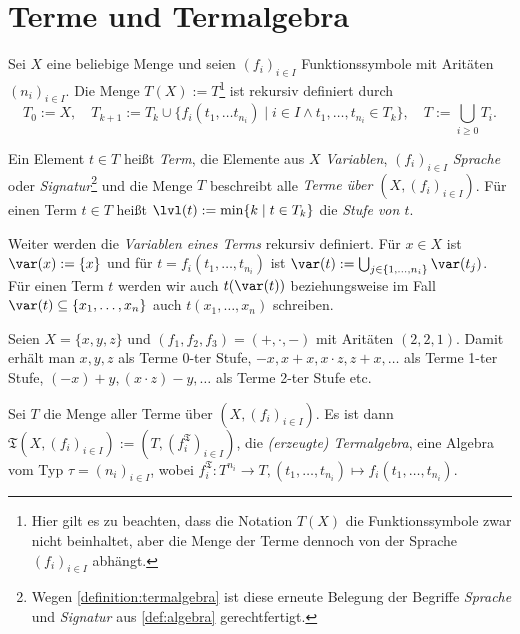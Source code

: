 \section{Terme und Termalgebra}

\begin{definition}
    Sei $X$ eine beliebige Menge und seien $(f_i)_{i \in I}$ Funktionssymbole mit Aritäten $(n_i)_{i \in I}$. Die Menge $T(X) := T$\footnote{Hier gilt es zu beachten, dass die Notation $T(X)$ die Funktionssymbole zwar nicht beinhaltet, aber die Menge der Terme dennoch von der Sprache $(f_i)_{i\in I}$ abhängt.} ist rekursiv definiert durch $$T_0 := X ,\quad T_{k+1} := T_k \cup \{f_i(t_1, \ldots t_{n_i}) \mid i \in I \land t_1, \ldots, t_{n_i} \in T_k\},\quad T := \bigcup_{i \ge 0} T_i.$$ 
    
    Ein Element $t \in T$ heißt \emph{Term}, die Elemente aus $X$ \emph{Variablen}, $(f_i)_{i \in I}$ \emph{Sprache} oder \emph{Signatur}\footnote{Wegen \cref{definition:termalgebra} ist diese erneute Belegung der Begriffe \emph{Sprache} und \emph{Signatur} aus \cref{def:algebra} gerechtfertigt.} und die Menge $T$ beschreibt alle \emph{Terme über $(X, (f_i)_{i \in I})$}.
    Für einen Term $t \in T$ heißt $\lvl(t) := \min\{k \mid t \in T_k\}$ die \emph{Stufe von $t$}. 
    
    Weiter werden die \emph{Variablen eines Terms} rekursiv definiert. Für $x \in X$ ist $\var(x) := \{x\}$ und für $t = f_i(t_1, \ldots, t_{n_i})$ ist $\var(t) := \bigcup_{j \in \{1, \ldots, n_i\}} \var(t_j)$. Für einen Term $t$ werden wir auch $t(\var(t))$ beziehungsweise im Fall $\var(t)\subseteq\{x_1,\ldots,x_n\}$ auch $t(x_1,\ldots,x_n)$ schreiben.
\end{definition}

\begin{example}
    Seien $X = \{x,y,z\}$ und $(f_1, f_2, f_3) = (+, \cdot, -)$ mit Aritäten $(2,2,1)$. Damit erhält man $x,y,z$ als Terme 0-ter Stufe, $-x, x+x, x\cdot z, z + x, \ldots$ als Terme 1-ter Stufe, $(-x) + y, (x \cdot z) - y, \ldots$ als Terme 2-ter Stufe etc.
\end{example}

\begin{definition}\label{definition:termalgebra}
    Sei $T$ die Menge aller Terme über $(X, (f_i)_{i \in I})$. Es ist dann $\mathfrak{T}(X, (f_i)_{i \in I}) := (T, (f_i^\mathfrak{T})_{i\in I})$, die \emph{(erzeugte) Termalgebra}, eine Algebra vom Typ $\tau = (n_i)_{i \in I}$, wobei $f_i^\mathfrak{T}: T^{n_i} \to T, (t_1, \ldots, t_{n_i}) \mapsto f_i(t_1, \ldots, t_{n_i})$.
\end{definition}

